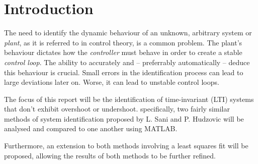 \section{Introduction}

The  need  to  identify the dynamic behaviour of an unknown, arbitrary system or
\textit{plant}, as it is referred to in control theory, is a common problem. The
plant's behaviour dictates  how  the \textit{controller} must behave in order to
create  a  stable  \textit{control  loop}.  The  ability to  accurately  and  --
preferrably  automatically  -- deduce this behaviour is crucial. Small errors in
the identification process can lead to large deviations later on. Worse, it  can
lead to unstable control loops.

The focus of this  report  will  be  the  identification of time-invariant (LTI)
systems that don't  exhibit  overshoot  or  undershoot. specifically, two fairly
similar methods of system identification proposed by L.  Sani\cite{ref:sani} and
P.  Hudzovic\cite{ref:hudzovic}  will be analysed and compared  to  one  another
using MATLAB.
 
Furthermore,  an extension to both methods involving a least squares fit will be
proposed,  allowing  the  results  of   both  methods  to  be  further  refined.

